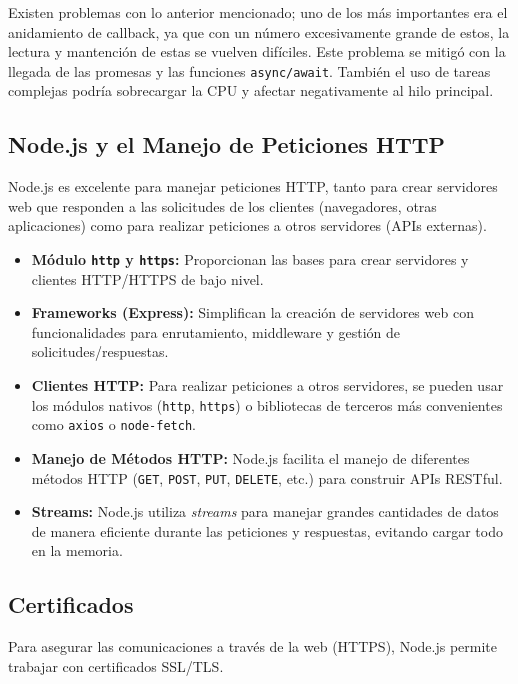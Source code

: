 \documentclass[a4paper, 12pt]{book}
\begin{document}
Existen problemas con lo anterior mencionado; uno de los más importantes era el anidamiento de callback, ya que con un número excesivamente grande de estos, la lectura y mantención de estas se vuelven difíciles. Este problema se mitigó con la llegada de las promesas y las funciones \texttt{async/await}. También el uso de tareas complejas podría sobrecargar la CPU y afectar negativamente al hilo principal. 

\subsection{Node.js y el Manejo de Peticiones HTTP} 

Node.js es excelente para manejar peticiones HTTP, tanto para crear servidores web que responden a las solicitudes de los clientes (navegadores, otras aplicaciones) como para realizar peticiones a otros servidores (APIs externas).

\begin{itemize}
  \item \textbf{Módulo \texttt{http} y \texttt{https}:} Proporcionan las bases para crear servidores y clientes HTTP/HTTPS de bajo nivel.

  \item \textbf{Frameworks (Express):} Simplifican la creación de servidores web con funcionalidades para enrutamiento, middleware y gestión de solicitudes/respuestas.

  \item \textbf{Clientes HTTP:} Para realizar peticiones a otros servidores, se pueden usar los módulos nativos (\texttt{http}, \texttt{https}) o bibliotecas de terceros más convenientes como \texttt{axios} o \texttt{node-fetch}.

  \item \textbf{Manejo de Métodos HTTP:} Node.js facilita el manejo de diferentes métodos HTTP (\texttt{GET}, \texttt{POST}, \texttt{PUT}, \texttt{DELETE}, etc.) para construir APIs RESTful.

  \item \textbf{Streams:} Node.js utiliza \textit{streams} para manejar grandes cantidades de datos de manera eficiente durante las peticiones y respuestas, evitando cargar todo en la memoria.
\end{itemize}
\subsection{Certificados} 

Para asegurar las comunicaciones a través de la web (HTTPS), Node.js permite trabajar con certificados SSL/TLS.
\end{document}
